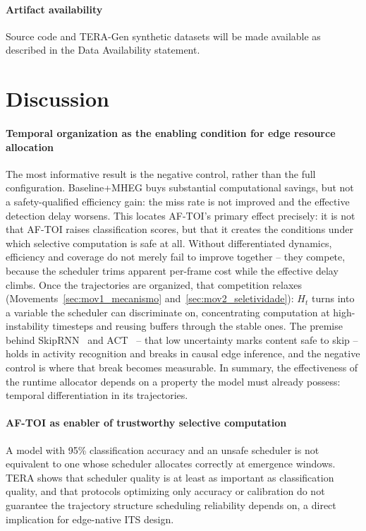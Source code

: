 \documentclass[a4paper,fleqn]{cas-dc}
\newcommand{\TERAGen}{\mbox{TERA-Gen}\xspace}
\newcommand{\AFTOI}{\mbox{AF-TOI}\xspace}
\begin{document}
\paragraph{Artifact availability}
Source code and \TERAGen synthetic datasets will be made available as
described in the Data Availability statement.
\section{Discussion}
\label{sec:discussao}
\paragraph{Temporal organization as the enabling condition for edge resource allocation}
The most informative result is the negative control, rather than the full
configuration. {\color{\revcolor}Baseline+MHEG buys substantial computational
savings, but not a safety-qualified efficiency gain: the miss rate is not
improved and the effective detection delay worsens.} This locates \AFTOI's primary effect precisely: it is not that \AFTOI raises
classification scores, but that it creates the conditions under which selective
computation is safe at all. Without differentiated dynamics, efficiency and
coverage do not merely fail to improve together -- they compete, because the
scheduler trims apparent per-frame cost while the effective delay climbs. Once the
trajectories are organized, that competition relaxes
(Movements~\ref{sec:mov1_mecanismo} and~\ref{sec:mov2_seletividade}): $H_t$ turns
into a variable the scheduler can discriminate on, concentrating computation at
high-instability timesteps and reusing buffers through the stable ones. The premise
behind SkipRNN~\cite{campos2018skip} and ACT~\cite{graves2016adaptive} -- that low
uncertainty marks content safe to skip -- holds in activity recognition and breaks
in causal edge inference, and the negative control is where that break becomes
measurable. In summary, the effectiveness of the runtime allocator depends on a property the model must already possess: temporal differentiation in its trajectories.
\paragraph{AF-TOI as enabler of trustworthy selective computation}
A model with 95\% classification accuracy and an unsafe scheduler is not
equivalent to one whose scheduler allocates correctly at emergence windows. TERA
shows that scheduler quality is at least as important as classification quality,
and that protocols optimizing only accuracy or calibration do not guarantee the
trajectory structure scheduling reliability depends on, a direct implication for
edge-native ITS design.
\end{document}
